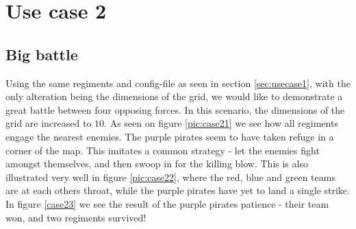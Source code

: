 \section{Use case 2}
	\subsection*{Big battle}
	Using the same regiments and config-file as seen in section \ref{sec:usecase1}, with the only alteration being the dimensions of the grid, we would like to demonstrate a great battle between four opposing forces. In this scenario, the dimensions of the grid are increased to $10$. As seen on figure \ref{pic:case21} we see how all regiments engage the nearest enemies. The purple pirates seem to have taken refuge in a corner of the map. This imitates a common strategy - let the enemies fight amongst themselves, and then swoop in for the killing blow. This is also illustrated very well in figure \ref{pic:case22}, where the red, blue and green teams are at each others throat, while the purple pirates have yet to land a single strike. In figure \ref{case23} we see the result of the purple pirates patience - their team won, and two regiments survived!
	

